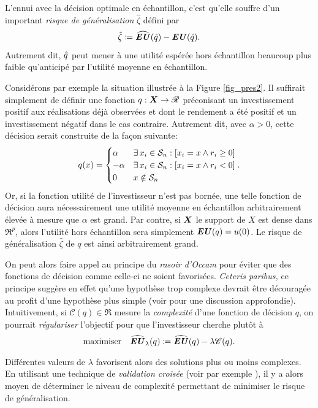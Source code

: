 L'ennui avec la décision optimale en échantillon, c'est qu'elle souffre d'un important
\textit{risque de généralisation} $\hat\zeta$ défini par
\begin{equation}
  \hat\zeta \coloneq \hEU(\qh) - \EU(\qh).
\end{equation}
Autrement dit, $\qh$ peut mener à une utilité espérée hors échantillon beaucoup plus
faible qu'anticipé par l'utilité moyenne en échantillon.

Considérons par exemple la situation illustrée à la Figure \ref{fig_pres2}. Il suffirait
simplement de définir une fonction $q:\X\to\Re$ préconisant un investissement positif aux
réalisations déjà observées et dont le rendement a été positif et un investissement
négatif dans le cas contraire. Autrement dit, avec $\alpha>0$, cette décision serait construite
de la façon suivante:
\begin{equation}
  q(x) =
  \begin{cases}
     \alpha & \exists\,x_i \in \S_n: [x_i = x \wedge r_i \geq 0]\\
    -\alpha & \exists\,x_i \in \S_n: [x_i = x \wedge r_i < 0]\\
     0 & x \notin \S_n
  \end{cases}.
\end{equation}
Or, si la fonction utilité de l'investisseur n'est pas bornée, une telle fonction de
décision aura nécessairement une utilité moyenne en échantillon arbitrairement élevée à
mesure que $\alpha$ est grand. Par contre, si $\X$ le support de $X$ est dense dans
$\Re^p$, alors l'utilité hors échantillon sera simplement $\EU(q) = u(0)$. Le risque de
généralisation $\hat\zeta$ de $q$ est ainsi arbitrairement grand.

On peut alors faire appel au principe du \textit{rasoir d'Occam} pour éviter que des
fonctions de décision comme celle-ci ne soient favorisées. \textit{Ceteris paribus,} ce
principe suggère en effet qu'une hypothèse trop complexe devrait être découragée au profit
d'une hypothèse plus simple (voir \cite{vapnik1998statistical} pour une discussion
approfondie). Intuitivement, si $\mathscr{C}(q) \in \Re$ mesure la \textit{complexité} d'une
fonction de décision $q$, on pourrait \textit{régulariser} l'objectif pour que
l'investisseur cherche plutôt à
\begin{equation}
  \maximizeEquation{\hEU_\lambda(q) \coloneq \hEU(q) - \lambda\mathscr{C}(q).}
\end{equation}
Différentes valeurs de $\lambda$ favorisent alors des solutions plus ou moins complexes. En
utilisant une technique de \textit{validation croisée} (voir par exemple
\cite{bishop2006pattern}), il y a alors moyen de déterminer le niveau de complexité
permettant de minimiser le risque de généralisation.

